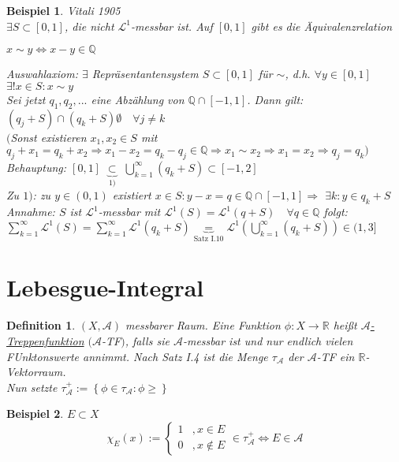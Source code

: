 \documentclass[11pt]{memoir}
\theoremstyle{changebreak}
\newtheorem{Definition}{Definition}[chapter]
\newtheorem{Beispiel}{Beispiel}[chapter]
\begin{document}
\begin{Beispiel}
\emph{Vitali 1905} \\
$\exists S \subset [0, 1]$, die nicht $\mathscr L^1$-messbar ist. Auf $[0, 1]$ gibt es die Äquivalenzrelation
\begin{center}
	$x \sim y \Leftrightarrow x - y \in \mathbb Q$
\end{center}
Auswahlaxiom: $\exists$ Repräsentantensystem $S \subset [0, 1]$ für $\sim$, d.h. $\forall y \in [0, 1]$ $\exists! x \in S: x \sim y$ \\
Sei jetzt $q_1, q_2, ...$ eine Abzählung von $\mathbb Q \cap [-1, 1]$. Dann gilt: $(q_j + S) \cap (q_k +S)  \emptyset \quad \forall j \ne k$ \\
$($Sonst existieren $x_1, x_2 \in S$ mit $q_j +x_1 = q_k + x_2 \Rightarrow x_1-x_2 = q_k -q_j \in \mathbb Q \Rightarrow x_1 \sim x_2  \Rightarrow x_1 = x_2 \Rightarrow q_j = q_k $\blitzd $ )$ \\

\emph{Behauptung:} $[0, 1]$ $\underbrace{\subset}_{1)}$ $\bigcup\limits_{k=1}^\infty
 (q_k + S) \subset [-1, 2]$ \\
 Zu $1)$: zu $y \in (0, 1)$ existiert $x \in S: y - x = q \in \mathbb Q \cap [-1, 1] \Rightarrow$ $\exists k: y \in q_k + S$ \\
\emph{Annahme:} $S$ ist $\mathscr L^1$-messbar mit $\mathscr L^1(S) = \mathscr L^1(q + S)\quad \forall q \in \mathbb Q$ folgt: $\sum\limits_{k=1}^\infty \mathscr L^1(S) = \sum\limits_{k=1}^\infty \mathscr L^1(q_k + S) \underbrace{=}_ {\text{Satz I.10}} \mathscr L^1\left(\bigcup\limits_{k=1}^\infty (q_k + S) \right) \in (1, 3]$ \blitzd
\end{Beispiel}


\section{Lebesgue-Integral}
\begin{Definition}
$(X, \mathscr A)$ messbarer Raum. Eine Funktion $\phi: X \rightarrow \mathbb R$ heißt \underline{$\mathscr A$-Treppenfunktion} $(\mathscr A$-TF$)$, falls sie $\mathscr A$-messbar ist und nur endlich vielen FUnktonswerte annimmt. Nach Satz I.4 ist die Menge $\tau_ \mathscr A$ der $\mathscr A$-TF ein $\mathbb R$-Vektorraum. \\
Nun setzte $\tau_\mathscr A^+ := \left\{\phi\in \tau_\mathscr A: \phi \geq\right\}$
\end{Definition}


\begin{Beispiel}
$E \subset X$ \\
\begin{equation}
	\chi_E (x) :=
	\begin{cases}
		1 &, x \in E \\
		0 & , x \notin E
	\end{cases}
	\in \tau_\mathscr A^+ \Leftrightarrow E \in \mathscr A
\end{equation}
\end{Beispiel}
\end{document}

